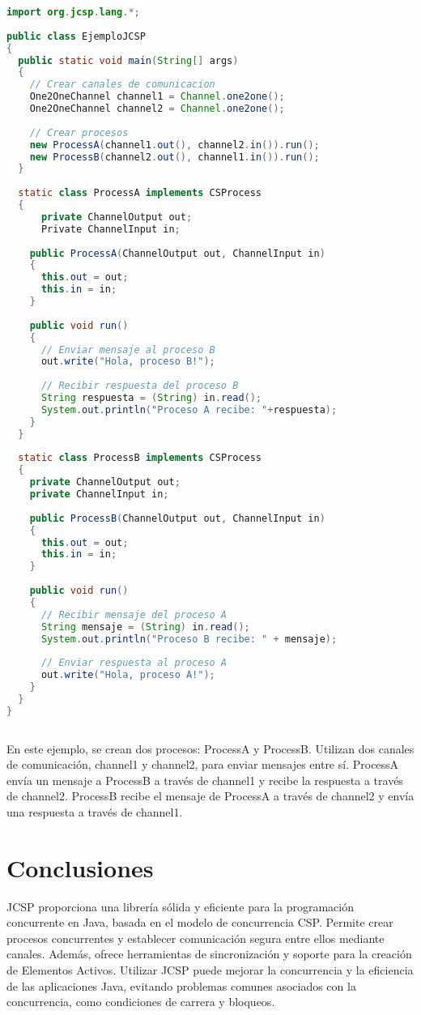 \begin{lstlisting}[language=Java, frame=single]
import org.jcsp.lang.*;
	
public class EjemploJCSP
{
  public static void main(String[] args)
  {
    // Crear canales de comunicacion
	One2OneChannel channel1 = Channel.one2one();
	One2OneChannel channel2 = Channel.one2one();
					
	// Crear procesos
	new ProcessA(channel1.out(), channel2.in()).run();
	new ProcessB(channel2.out(), channel1.in()).run();
  }
			
  static class ProcessA implements CSProcess
  {
      private ChannelOutput out;
	  Private ChannelInput in;
				
    public ProcessA(ChannelOutput out, ChannelInput in)
    {
      this.out = out;
	  this.in = in;
    }
				
    public void run()
    {
      // Enviar mensaje al proceso B
	  out.write("Hola, proceso B!");
					
      // Recibir respuesta del proceso B
      String respuesta = (String) in.read();
      System.out.println("Proceso A recibe: "+respuesta);
    }
  }
			
  static class ProcessB implements CSProcess
  {
    private ChannelOutput out;
	private ChannelInput in;
				
	public ProcessB(ChannelOutput out, ChannelInput in)
	{
	  this.out = out;
	  this.in = in;
	}
				
	public void run()
	{
	  // Recibir mensaje del proceso A
	  String mensaje = (String) in.read();
	  System.out.println("Proceso B recibe: " + mensaje);
			
	  // Enviar respuesta al proceso A
	  out.write("Hola, proceso A!");
	}
  }
}
	
\end{lstlisting}

En este ejemplo, se crean dos procesos: ProcessA y ProcessB. Utilizan dos canales de comunicación, channel1 y channel2, para enviar mensajes entre sí. ProcessA envía un mensaje a ProcessB a través de channel1 y recibe la respuesta a través de channel2. ProcessB recibe el mensaje de ProcessA a través de channel2 y envía una respuesta a través de channel1.

\section*{Conclusiones}
JCSP proporciona una librería sólida y eficiente para la programación concurrente en Java, basada en el modelo de concurrencia CSP. Permite crear procesos concurrentes y establecer comunicación segura entre ellos mediante canales. Además, ofrece herramientas de sincronización y soporte para la creación de Elementos Activos. Utilizar JCSP puede mejorar la concurrencia y la eficiencia de las aplicaciones Java, evitando problemas comunes asociados con la concurrencia, como condiciones de carrera y bloqueos.